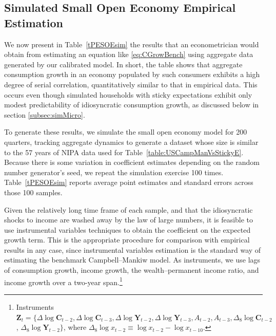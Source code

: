 \documentclass[titlepage]{article}
\begin{document}
\subsection{Simulated Small Open Economy Empirical Estimation}
\label{subsec:SOEResults}

We now present in Table~\ref{tPESOEsim} the results that an econometrician would obtain from estimating an equation like \eqref{eq:CGrowBench} using aggregate data generated by our calibrated model.  In short, the table shows that aggregate consumption growth in an economy populated by such consumers exhibits a high degree of serial correlation, quantitatively similar to that in empirical data.  This occurs even though simulated households with sticky expectations exhibit only modest predictability of idiosyncratic consumption growth, as discussed below in section \ref{subsec:simMicro}.

To generate these results, we simulate the small open economy model for 200 quarters, tracking aggregate dynamics to generate a dataset whose size is similar to the 57 years of NIPA data used for Table~\ref{table:USCampManVsStickyE}.  Because there is some variation in coefficient estimates depending on the random number generator's seed, we repeat the simulation exercise 100 times.  Table~\ref{tPESOEsim} reports average point estimates and standard errors across those 100 samples.

Given the relatively long time frame of each sample, and that the idiosyncratic shocks to income are washed away by the law of large numbers, it is feasible to use instrumental variables techniques to obtain the coefficient on the expected growth term.  This is the appropriate procedure for comparison with empirical results in any case, since instrumental variables estimation is the standard way of estimating the benchmark Campbell--Mankiw model.  As instruments, we use lags of consumption growth, income growth, the wealth--permanent income ratio, and income growth over a two-year span.\footnote{Instruments $\textbf{Z}_t = \{\Delta \log \mathbf{C}_{t-2}, \Delta \log \mathbf{C}_{t-3}, \Delta \log \mathbf{Y}_{t-2}, \Delta \log \mathbf{Y}_{t-3}, A_{t-2}, A_{t-3}, \Delta_8 \log \mathbf{C}_{t-2}$, $\Delta_8 \log \mathbf{Y}_{t-2} \}$, where $\Delta_8 \log x_{t-2}\equiv \log x_{t-2}-\log x_{t-10}$.}
\end{document}
